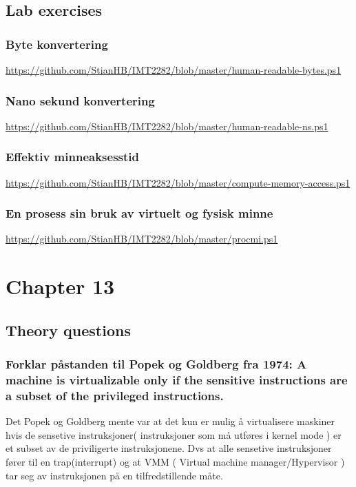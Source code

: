 \documentclass[9pt]{article}
\begin{document}
\subsection{Lab exercises}

\subsubsection{Byte konvertering} \url{https://github.com/StianHB/IMT2282/blob/master/human-readable-bytes.ps1}
\subsubsection{Nano sekund konvertering} \url{https://github.com/StianHB/IMT2282/blob/master/human-readable-ns.ps1}
\subsubsection{Effektiv minneaksesstid} \url{https://github.com/StianHB/IMT2282/blob/master/compute-memory-access.ps1}
\subsubsection{En prosess sin bruk av virtuelt og fysisk minne} \url{https://github.com/StianHB/IMT2282/blob/master/procmi.ps1}


\section{Chapter 13}
\setcounter{subsection}{5}
\subsection{Theory questions}

\subsubsection{Forklar påstanden til Popek og Goldberg fra 1974: A machine is virtualizable only if the sensitive instructions are a subset of the privileged instructions.}

Det Popek og Goldberg mente var at det kun er mulig å virtualisere maskiner hvis de sensetive instruksjoner( instruksjoner som må utføres i kernel mode ) er et subset av de priviligerte instruksjonene. Dvs at alle sensetive instruksjoner fører til en trap(interrupt) og at VMM ( Virtual machine manager/Hypervisor ) tar seg av instruksjonen på en tilfredstillende måte.
\end{document}
